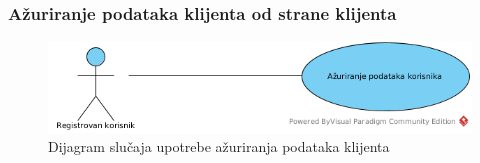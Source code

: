 \subsubsection{Ažuriranje podataka klijenta od strane klijenta}

\begin{figure}[H]
\begin{center}
\includegraphics[width=\textwidth]{Pictures/uc_update_user_profile.png}
\end{center}
    \caption{Dijagram slučaja upotrebe ažuriranja podataka klijenta}
\label{fig:UCUpdateUserProfile}
\end{figure}

